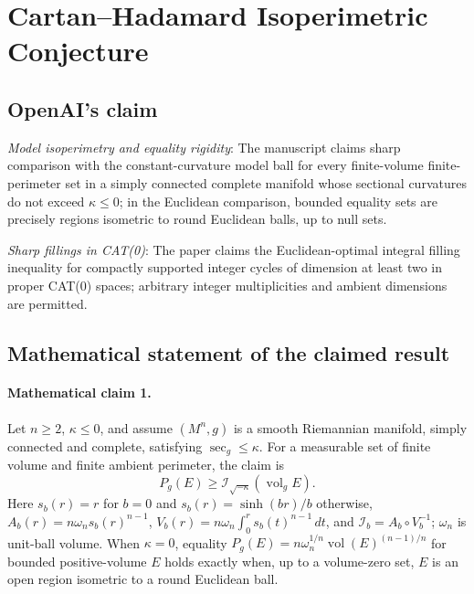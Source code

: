 \documentclass[11pt]{article}
\begin{document}
\section*{Cartan–Hadamard Isoperimetric Conjecture}

\subsection{OpenAI's claim}
\textit{Model isoperimetry and equality rigidity}: The manuscript claims sharp comparison with the constant-curvature model ball for every finite-volume finite-perimeter set in a simply connected complete manifold whose sectional curvatures do not exceed $\kappa\le0$; in the Euclidean comparison, bounded equality sets are precisely regions isometric to round Euclidean balls, up to null sets.

\textit{Sharp fillings in CAT(0)}: The paper claims the Euclidean-optimal integral filling inequality for compactly supported integer cycles of dimension at least two in proper CAT(0) spaces; arbitrary integer multiplicities and ambient dimensions are permitted.

\subsection{Mathematical statement of the claimed result}
\paragraph{Mathematical claim 1.} Let $n\ge2$, $\kappa\le0$, and assume $(M^n,g)$ is a smooth Riemannian manifold, simply connected and complete, satisfying $\sec_g\le\kappa$. For a measurable set of finite volume and finite ambient perimeter, the claim is \[P_g(E)\ge\mathcal I_{\sqrt{-\kappa}}(\operatorname{vol}_g E).\] Here $s_b(r)=r$ for $b=0$ and $s_b(r)=\sinh(br)/b$ otherwise, $A_b(r)=n\omega_ns_b(r)^{n-1}$, $V_b(r)=n\omega_n\int_0^rs_b(t)^{n-1}\,dt$, and $\mathcal I_b=A_b\circ V_b^{-1}$; $\omega_n$ is unit-ball volume. When $\kappa=0$, equality $P_g(E)=n\omega_n^{1/n}\operatorname{vol}(E)^{(n-1)/n}$ for bounded positive-volume $E$ holds exactly when, up to a volume-zero set, $E$ is an open region isometric to a round Euclidean ball.
\end{document}
